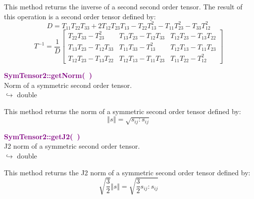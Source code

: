 This method returns the inverse of a second second order tensor.
The result of this operation is a second order tensor defined by:
\begin{equation*}
D = T_{11} T_{22} T_{33} + 2 T_{12} T_{23} T_{13} - T_{22} T_{13}^2 - T_{11} T_{23}^2 - T_{33} T_{12}^2
\end{equation*}
\begin{equation*}
T^{-1} = \frac {1}{D} \left[\begin{array}{ccc}
  T_{22}T_{33}-T_{23}^2&T_{13}T_{23}-T_{12}T_{33}&T_{12}T_{23}-T_{13}T_{22}\\
  T_{13}T_{23}-T_{12}T_{33}&T_{11}T_{33}-T_{13}^2&T_{12}T_{13}-T_{11}T_{23}\\
  T_{12}T_{23}-T_{13}T_{22}&T_{12}T_{13}-T_{11}T_{23}&T_{11}T_{22}-T_{12}^2
  \end{array}
  \right]
\end{equation*}

\textcolor{purple}{\textbf{SymTensor2::getNorm(~)}}\label{SymTensor2::getNorm()}\\
Norm of a symmetric second order tensor.\\ \hspace*{10mm}$\hookrightarrow$ double

This method returns the norm of a symmetric second order tensor defined by:
\begin{equation*}
\left\Vert s \right\Vert  = \sqrt {s_{ij}:s_{ij}}
\end{equation*}

\textcolor{purple}{\textbf{SymTensor2::getJ2(~)}}\label{SymTensor2::getJ2()}\\
J2 norm of a symmetric second order tensor.\\ \hspace*{10mm}$\hookrightarrow$ double

This method returns the J2 norm of a symmetric second order tensor defined by:
\begin{equation*}
\sqrt {\frac{3}{2}} \left\Vert s \right\Vert  = \sqrt {\frac{3}{2} s_{ij}:s_{ij}}
\end{equation*}

